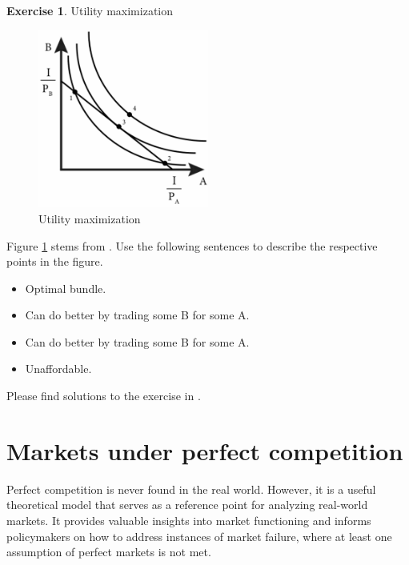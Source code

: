 \documentclass[
  12pt,
  oneside]{book}
\providecommand{\tightlist}{%
  \setlength{\itemsep}{0pt}\setlength{\parskip}{0pt}}
\theoremstyle{definition}
\theoremstyle{definition}
\theoremstyle{definition}
\newtheorem{exercise}{Exercise}[chapter]
\theoremstyle{definition}
\theoremstyle{remark}
\begin{document}
\begin{exercise}
\protect\hypertarget{exr:Umax}{}\label{exr:Umax}Utility maximization

\begin{figure}
\centering
\includegraphics[width=0.5\textwidth,height=\textheight]{fig/utility-max.jpg}
\caption[\label{fig:utilmax} Utility maximization]{\label{fig:utilmax} Utility maximization\footnotemark{}}
\end{figure}

Figure \ref{fig:utilmax} stems from \citet[ch.~4]{Emerson2020Intermediate}. Use the following sentences to describe the respective points in the figure.

\begin{itemize}
\tightlist
\item
  Optimal bundle.
\item
  Can do better by trading some B for some A.
\item
  Can do better by trading some B for some A.
\item
  Unaffordable.
\end{itemize}

Please find solutions to the exercise in \citet[ch.~4]{Emerson2020Intermediate}.
\end{exercise}

\section{Markets under perfect competition}\label{markets-under-perfect-competition}

Perfect competition is never found in the real world. However, it is a useful theoretical model that serves as a reference point for analyzing real-world markets. It provides valuable insights into market functioning and informs policymakers on how to address instances of market failure, where at least one assumption of perfect markets is not met.
\end{document}
